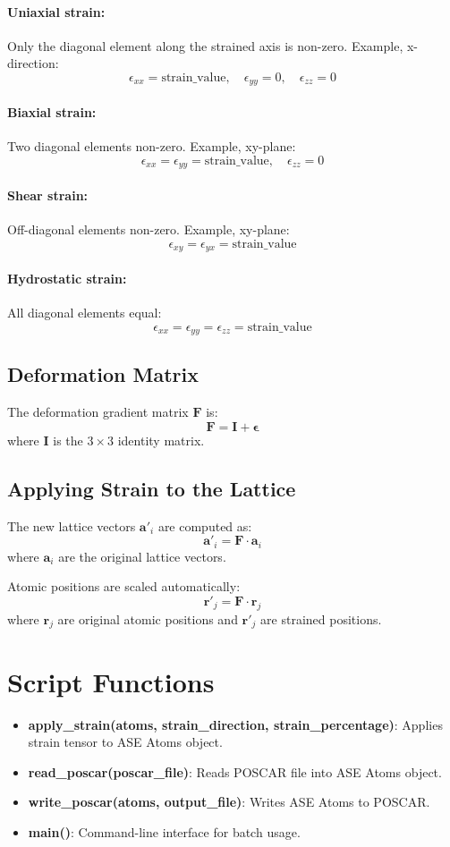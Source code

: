 \documentclass[12pt]{article}
\begin{document}
\paragraph{Uniaxial strain:} Only the diagonal element along the strained axis is non-zero. Example, x-direction:
\[
\epsilon_{xx} = \text{strain\_value}, \quad
\epsilon_{yy} = 0, \quad
\epsilon_{zz} = 0
\]

\paragraph{Biaxial strain:} Two diagonal elements non-zero. Example, xy-plane:
\[
\epsilon_{xx} = \epsilon_{yy} = \text{strain\_value}, \quad
\epsilon_{zz} = 0
\]

\paragraph{Shear strain:} Off-diagonal elements non-zero. Example, xy-plane:
\[
\epsilon_{xy} = \epsilon_{yx} = \text{strain\_value}
\]

\paragraph{Hydrostatic strain:} All diagonal elements equal:
\[
\epsilon_{xx} = \epsilon_{yy} = \epsilon_{zz} = \text{strain\_value}
\]

\subsection{Deformation Matrix}
The deformation gradient matrix $\mathbf{F}$ is:
\[
\mathbf{F} = \mathbf{I} + \boldsymbol{\epsilon}
\]
where $\mathbf{I}$ is the $3 \times 3$ identity matrix.

\subsection{Applying Strain to the Lattice}
The new lattice vectors $\mathbf{a}'_i$ are computed as:
\[
\mathbf{a}'_i = \mathbf{F} \cdot \mathbf{a}_i
\]
where $\mathbf{a}_i$ are the original lattice vectors.

Atomic positions are scaled automatically:
\[
\mathbf{r}'_j = \mathbf{F} \cdot \mathbf{r}_j
\]
where $\mathbf{r}_j$ are original atomic positions and $\mathbf{r}'_j$ are strained positions.

\section{Script Functions}
\begin{itemize}
    \item \textbf{apply\_strain(atoms, strain\_direction, strain\_percentage)}: Applies strain tensor to ASE Atoms object.
    \item \textbf{read\_poscar(poscar\_file)}: Reads POSCAR file into ASE Atoms object.
    \item \textbf{write\_poscar(atoms, output\_file)}: Writes ASE Atoms to POSCAR.
    \item \textbf{main()}: Command-line interface for batch usage.
\end{itemize}
\end{document}
